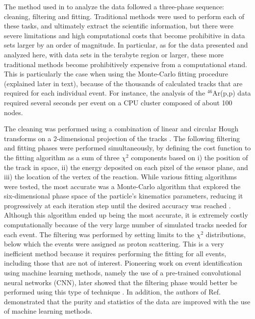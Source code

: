 \documentclass[preprint,12pt]{elsarticle}
\begin{document}
The method used in \cite{Bradt2018} to analyze the data followed a three-phase sequence: cleaning, filtering and fitting. Traditional methods were used to perform each of these tasks, and ultimately extract the scientific information, but there were severe limitations and high computational costs that become prohibitive in data sets larger by an order of magnitude.  In particular, as for the data presented and analyzed here, with data sets in the terabyte region or larger, these more traditional methods become prohibitively expensive from a computational stand. This is particularly the case when using the Monte-Carlo fitting procedure (explained later in text), because of the thousands of calculated tracks that are required for each individual event. For instance, the analysis of the $^{46}$Ar(p,p) data required several seconds per event on a CPU cluster composed of about 100 nodes.

The cleaning was performed using a combination of linear and circular Hough transforms on a 2-dimensional projection of the tracks \cite{Bradt2017}. The following filtering and fitting phases were performed simultaneously, by defining the cost function to the fitting algorithm as a sum of three $\chi^2$ components based on i) the position of the track in space, ii) the energy deposited on each pixel of the sensor plane, and iii) the location of the vertex of the reaction. While various fitting algorithms were tested, the most accurate was a Monte-Carlo algorithm that explored the six-dimensional phase space of the particle's kinematics parameters, reducing it progressively at each iteration step until the desired accuracy was reached \cite{Bradt2017}. Although this algorithm ended up being the most accurate, it is extremely costly computationally because of the very large number of simulated tracks needed for each event. The filtering was performed by setting limits to the $\chi^2$ distributions, below which the events were assigned as proton scattering. This is a very inefficient method because it requires performing the fitting for all events, including those that are not of interest. Pioneering work on event identification using machine learning methods, namely the use of a pre-trained convolutional neural networks (CNN), later showed that the filtering phase would better be performed using this type of technique \cite{Kuchera2019}. 
In addition, the authors of Ref.~\cite{Kuchera2019} demonstrated that the purity and statistics of the data are improved with the use of machine learning methods.
\end{document}

